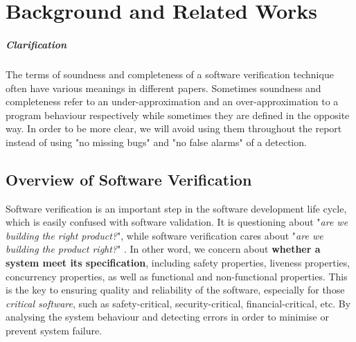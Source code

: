
\chapter{Background and Related Works}

\paragraph{Clarification} The terms of soundness and completeness of a software verification technique often have various meanings in different papers. Sometimes soundness and completeness refer to an under-approximation and an over-approximation to a program behaviour respectively while sometimes they are defined in the opposite way. In order to be more clear, we will avoid using them throughout the report instead of using "no missing bugs" and "no false alarms" of a detection.  

\section{Overview of Software Verification}
\label{sec:osv}
Software verification is an important step in the software development life cycle, which is easily confused with software validation. It is questioning about "\textit{are we building the right product?}", while software verification cares about "\textit{are we building the product right?}" \cite{kung2008software}. In other word, we concern about \textbf{whether a system meet its specification}, including safety properties, liveness properties, concurrency properties, as well as functional and non-functional properties. This is the key to ensuring quality and reliability of the software, especially for those \textit{critical software}, such as safety-critical, security-critical, financial-critical, etc. By analysing the system behaviour and detecting errors in order to minimise or prevent system failure. 



